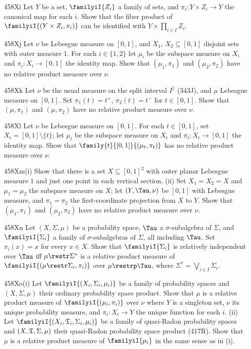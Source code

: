 {\sqheader 458Xi Let $Y$ be a set, $\familyiI{Z_i}$ a family of sets, and
$\pi_i:Y\times Z_i\to Y$ the canonical map for each $i$.   Show that the
fiber product of $\familyiI{(Y\times Z_i,\pi_i)}$ can be identified with
$Y\times\prod_{i\in I}Z_i$.

\spheader 458Xj Let $\nu$ be Lebesgue
measure on $[0,1]$, and $X_1$,
$X_2\subseteq[0,1]$ disjoint sets with outer measure $1$.   For each
$i\in\{1,2\}$ let $\mu_i$ be the
subspace measure on $X_i$ and
$\pi_i:X_i\to[0,1]$ the identity map.   Show that $(\mu_1,\pi_1)$ and
$(\mu_2,\pi_2)$ have no relative product measure over $\nu$.

\spheader 458Xk Let $\nu$ be the usual measure on the split interval
$I^{\|}$ (343J), and $\mu$ Lebesgue measure on
$[0,1]$.   Set $\pi_1(t)=t^+$, $\pi_2(t)=t^-$ for
$t\in[0,1]$.   Show that $(\mu,\pi_1)$ and
$(\mu,\pi_2)$ have no relative product measure over $\nu$.

\spheader 458Xl Let $\nu$ be Lebesgue measure on $[0,1]$.   For each
$t\in[0,1]$, set $X_t=[0,1]\setminus\{t\}$;  let
$\mu_t$ be the subspace measure on $X_t$ and
$\pi_t:X_t\to[0,1]$ the identity map.   Show that
$\family{t}{[0,1]}{(\mu_t,\pi_t)}$ has no relative product measure
over $\nu$.

\spheader 458Xm(i) Show that there is a set $X\subseteq[0,1]^2$ with outer
planar Lebesgue measure $1$ and just one point in each vertical section.
  (ii) Set $X_1=X_2=X$ and
$\mu_1=\mu_2$ the subspace measure on $X$;
let $(Y,\Tau,\nu)$ be $[0,1]$ with Lebesgue measure, and $\pi_1=\pi_2$ the
first-coordinate projection from $X$ to $Y$.   Show that
$(\mu_1,\pi_1)$ and $(\mu_2,\pi_2)$ have no
relative product measure over $\nu$.

\spheader 458Xn Let $(X,\Sigma,\mu)$ be a probability space, $\Tau$ a
$\sigma$-subalgebra of $\Sigma$, and $\familyiI{\Sigma_i}$ a family of
$\sigma$-subalgebras of $\Sigma$, all including $\Tau$.   Set
$\pi_i(x)=x$ for every
$x\in X$.   Show that $\familyiI{\Sigma_i}$ is relatively independent
over $\Tau$ iff  $\mu\restr\Sigma^*$ is a
relative product measure of $\familyiI{(\mu\restr\Sigma_i,\pi_i)}$
over $\mu\restrp\Tau$, where $\Sigma^*=\bigvee_{i\in I}\Sigma_i$.

\spheader 458Xo(i) Let $\familyiI{(X_i,\Sigma_i,\mu_i)}$ be a family of
probability spaces and $(X,\Sigma,\mu)$ their ordinary probability space
product.   Show that $\mu$ is a relative
product measure of $\familyiI{(\mu_i,\pi_i)}$ over
$\nu$ where $Y$ is a singleton set, $\nu$ its
unique probability measure, and $\pi_i:X_i\to Y$ the unique function for
each $i$.   (ii) Let $\familyiI{(X_i,\frak T_i,\Sigma_i,\mu_i)}$ be a
family of quasi-Radon probability spaces and $(X,\frak T,\Sigma,\mu)$
their quasi-Radon probability space product (417R).   Show that
$\mu$ is a relative product measure of
$\familyiI{\mu_i}$ in the same sense as in (i).

}
